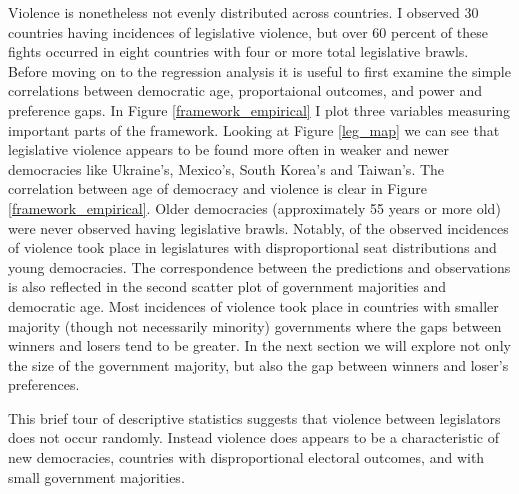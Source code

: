 \documentclass[a4paper]{article}\usepackage{graphicx, color}
\begin{document}
Violence is nonetheless not evenly distributed across countries. I observed 30 countries having incidences of legislative violence, but over 60 percent of these fights occurred in eight countries with four or more total legislative brawls. Before moving on to the regression analysis it is useful to first examine the simple correlations between democratic age, proportaional outcomes, and power and preference gaps. In Figure \ref{framework_empirical} I plot three variables measuring important parts of the framework. Looking at Figure \ref{leg_map} we can see that legislative violence appears to be found more often in weaker and newer democracies like Ukraine's, Mexico's, South Korea's and Taiwan's. The correlation between age of democracy and violence is clear in Figure \ref{framework_empirical}. Older democracies (approximately 55 years or more old) were never observed having legislative brawls. Notably, of the observed incidences of violence took place in legislatures with disproportional seat distributions and young democracies. The correspondence between the predictions and observations is also reflected in the second scatter plot of government majorities and democratic age. Most incidences of violence took place in countries with smaller majority (though not necessarily minority) governments where the gaps between winners and losers tend to be greater. In the next section we will explore not only the size of the government majority, but also the gap between winners and loser's preferences.  

This brief tour of descriptive statistics suggests that violence between legislators does not occur randomly. Instead violence does appears to be a characteristic of new democracies, countries with disproportional electoral outcomes, and with small government majorities.
\end{document}
